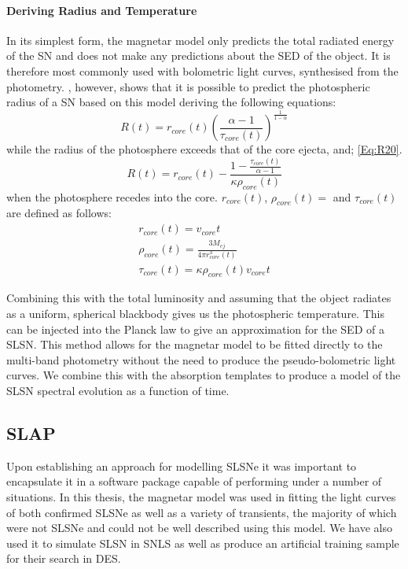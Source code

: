 \paragraph{Deriving Radius and Temperature}
In its simplest form, the magnetar model only predicts the total radiated energy of the SN and does not make any predictions about the SED of the object. It is therefore most commonly used with bolometric light curves, synthesised from the photometry. \citet{Inserra2013}, however, shows that it is possible to predict the photospheric radius of a SN based on this model deriving the following equations:
\begin{equation}
\label{Eq:R19}
R(t) = r_{core}(t) \left(\frac{\alpha - 1}{\tau_{core}(t)}\right)^\frac{1}{1 - \alpha}
\end{equation}
\noindent while the radius of the photosphere exceeds that of the core ejecta, and;
\ref{Eq:R20}.
\begin{equation}
\label{Eq:R20}
R(t) = r_{core}(t) - \frac{1 - \frac{\tau_{core}(t)}{\alpha - 1}}{\kappa \rho_{core}(t)}
\end{equation}
\noindent when the photosphere recedes into the core. $r_{core}(t)$, $\rho_{core}(t)=$ and $\tau_{core}(t)$ are defined as follows:
\begin{align}
r_{core}(t) = v_{core}  t \\
\rho_{core}(t)= \frac{3 M_{ej}}{4  \pi  r_{core}^3(t)}\\
\tau_{core}(t) = \kappa  \rho_{core}(t) v_{core} t
\end{align}

Combining this with the total luminosity and assuming that the object radiates as a uniform, spherical blackbody gives us the photospheric temperature. This can be injected into the Planck law to give an approximation for the SED of a SLSN. This method allows for the magnetar model to be fitted directly to the multi-band photometry without the need to produce the pseudo-bolometric light curves. We combine this with the absorption templates to produce a model of the SLSN spectral evolution as a function of time.

\subsection{SLAP} \label{sec:SLAP}
Upon establishing an approach for modelling SLSNe it was important to encapsulate it in a software package capable of performing under a number of situations. In this thesis, the magnetar model was used in fitting the light curves of both confirmed SLSNe as well as a variety of transients, the majority of which were not SLSNe and could not be well described using this model. We have also used it to simulate SLSN in SNLS as well as produce an artificial training sample for their search in DES.

